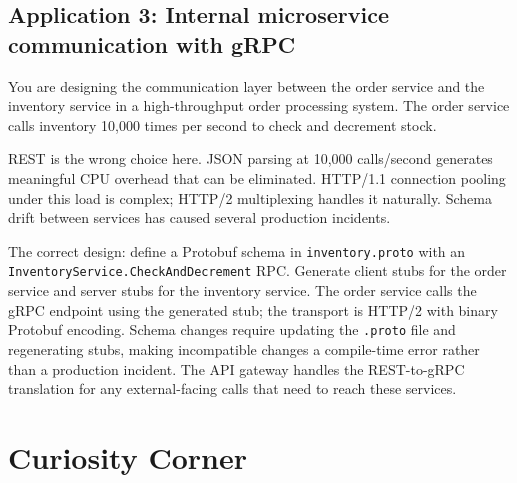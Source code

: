 \documentclass[11pt,a4paper]{article}
\begin{document}
\subsection{Application 3: Internal microservice communication with gRPC}

You are designing the communication layer between the order service and the inventory service in a high-throughput order processing system. The order service calls inventory 10,000 times per second to check and decrement stock.

REST is the wrong choice here. JSON parsing at 10,000 calls/second generates meaningful CPU overhead that can be eliminated. HTTP/1.1 connection pooling under this load is complex; HTTP/2 multiplexing handles it naturally. Schema drift between services has caused several production incidents.

The correct design: define a Protobuf schema in \texttt{inventory.proto} with an \texttt{InventoryService.\allowbreak{}CheckAndDecrement} RPC. Generate client stubs for the order service and server stubs for the inventory service. The order service calls the gRPC endpoint using the generated stub; the transport is HTTP/2 with binary Protobuf encoding. Schema changes require updating the \texttt{.proto} file and regenerating stubs, making incompatible changes a compile-time error rather than a production incident. The API gateway handles the REST-to-gRPC translation for any external-facing calls that need to reach these services.

\section{Curiosity Corner}
\end{document}
